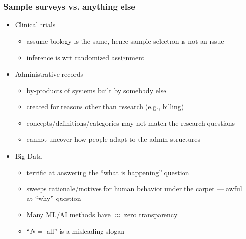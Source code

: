 \documentclass[aspectratio=43]{beamer}
\begin{document}
\begin{frame}\frametitle{Sample surveys vs. anything else}

\begin{itemize}
    \item Clinical trials
        \begin{itemize}
            \item assume biology is the same, hence sample selection is not an issue
            \item inference is wrt randomized assignment
        \end{itemize}
    \item Administrative records
        \begin{itemize}
            \item by-products of systems built by somebody else
            \item created for reasons other than research (e.g., billing)
            \item concepts/definitions/categories may not match the research questions
            \item cannot uncover how people adapt to the admin structures
        \end{itemize}
    \item Big Data
        \begin{itemize}
            \item terrific at answering the ``what is happening'' question
            \item sweeps rationale/motives for human behavior under the carpet --- awful at ``why'' question
            \item Many ML/AI methods have $\approx$ zero transparency
            \item ``$N=$ all'' is a misleading slogan
        \end{itemize}
\end{itemize}

\end{frame}
\end{document}
